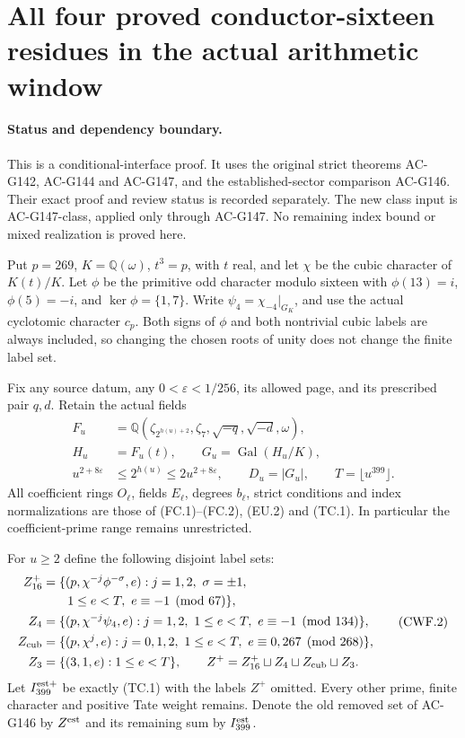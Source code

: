 \section{All four proved conductor-sixteen residues in the actual arithmetic window}
\label{sec:conductor16-four-residue-window}

\paragraph{Status and dependency boundary.}
This is a conditional-interface proof.  It uses the original strict
theorems AC-G142, AC-G144 and AC-G147, and the established-sector
comparison AC-G146.  Their exact proof and review status is recorded
separately.  The new class input is AC-G147-class, applied only through
AC-G147.  No remaining index bound or mixed realization is proved here.

Put $p=269$, $K=\mathbb Q(\omega)$, $t^3=p$, with $t$ real, and
let $\chi$ be the cubic character of $K(t)/K$.
Let $\phi$ be the primitive odd character modulo sixteen with
$\phi(13)=i$, $\phi(5)=-i$, and $\ker\phi=\{1,7\}$.
Write $\psi_4=\chi_{-4}|_{G_K}$, and use the actual cyclotomic
character $c_p$.  Both signs of $\phi$ and both nontrivial cubic
labels are always included, so changing the chosen roots of unity
does not change the finite label set.

Fix any source datum, any $0<\varepsilon<1/256$, its allowed page,
and its prescribed pair $q,d$.  Retain the actual fields
\[
 \begin{aligned}
 F_u&=\mathbb Q(\zeta_{2^{h(u)+2}},\zeta_7,
                  \sqrt{-q},\sqrt{-d},\omega),\\
 H_u&=F_u(t),\qquad G_u=\operatorname{Gal}(H_u/K),\\
 u^{2+8\varepsilon}&\leq2^{h(u)}\leq2u^{2+8\varepsilon},
 \qquad D_u=|G_u|,\qquad T=\lfloor u^{399}\rfloor.
 \end{aligned}
 \tag{CWF.1}
\]
All coefficient rings $O_\ell$, fields $E_\ell$, degrees $b_\ell$,
strict conditions and index normalizations are those of
(FC.1)--(FC.2), (EU.2) and (TC.1).  In particular the coefficient-prime
range remains unrestricted.

For $u\geq2$ define the following disjoint label sets:
\[
 \begin{aligned}
 Z_{16}^{+}&=\{(p,\chi^{-j}\phi^{-\sigma},e):
       j=1,2,\ \sigma=\pm1,\\
 &\hspace{2em}1\leq e<T,\ e\equiv-1\pmod{67}\},\\
 Z_4&=\{(p,\chi^{-j}\psi_4,e):
       j=1,2,\ 1\leq e<T,\ e\equiv-1\pmod{134}\},\\
 Z_{\rm cub}&=\{(p,\chi^j,e):
       j=0,1,2,\ 1\leq e<T,\ e\equiv0,267\pmod{268}\},\\
 Z_3&=\{(3,1,e):1\leq e<T\},\qquad
 Z^+=Z_{16}^{+}\sqcup Z_4\sqcup Z_{\rm cub}\sqcup Z_3.
 \end{aligned}
 \tag{CWF.2}
\]
Let $I_{399}^{\rm est+}$ be exactly (TC.1) with the labels $Z^+$
omitted.  Every other prime, finite character and positive Tate
weight remains.  Denote the old removed set of AC-G146 by $Z^{\rm est}$
and its remaining sum by $I_{399}^{\rm est}$.

